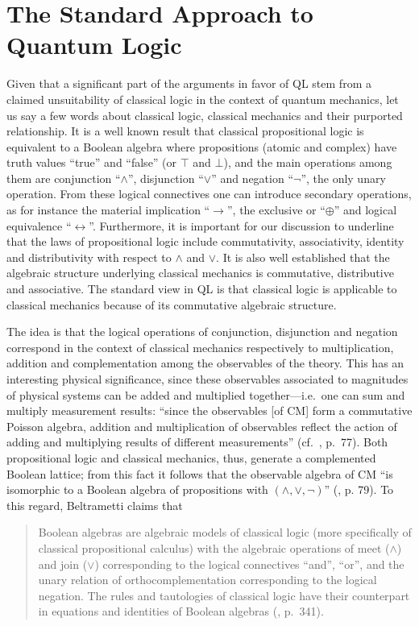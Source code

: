 \documentclass[11pt, executivepaper]{article}
\begin{document}
\section{The Standard Approach to Quantum Logic}
\label{QL}

Given that a significant part of the arguments in favor of QL stem from a claimed unsuitability of classical logic in the context of quantum mechanics, let us say a few words about classical logic, classical mechanics and their purported relationship.  It is a well known result that classical propositional logic is equivalent to a Boolean algebra where propositions (atomic and complex) have truth values ``true'' and ``false'' (or $\top$ and $\bot$), and the main operations among them are conjunction ``$\wedge$'', disjunction ``$\vee$'' and negation ``$\neg$'', the only unary operation. From these logical connectives one can introduce secondary operations, as for instance the material implication ``$\longrightarrow$'', the exclusive or ``$\oplus$'' and logical equivalence ``$\longleftrightarrow$''. Furthermore, it is important for our discussion to underline that the laws of propositional logic include commutativity, associativity, identity and distributivity with respect to $\wedge$ and $\vee$. It is also well established that the algebraic structure underlying classical mechanics is commutative, distributive and associative. The standard view in QL is that classical logic is applicable to classical mechanics because of its commutative algebraic structure.

The idea is that the logical operations of conjunction, disjunction and negation correspond in the context of classical mechanics respectively to multiplication, addition and complementation among the observables of the theory. This has an interesting physical significance, since these observables associated to magnitudes of physical systems can be added and multiplied together---i.e.\ one can sum and multiply measurement results: ``since the observables [of CM] form a commutative Poisson algebra, addition and multiplication of observables reflect the action of adding and multiplying results of different measurements'' (cf.\ \cite{David:2015}, p.\ 77). Both propositional logic and classical mechanics, thus, generate a complemented Boolean lattice; from this fact it follows that the observable algebra of CM ``is isomorphic to a Boolean algebra of propositions with $(\wedge, \vee, \neg)$'' (\cite{David:2015}, p. 79).
To this regard, Beltrametti claims that
\begin{quote}
Boolean algebras are algebraic models of classical logic (more specifically of classical propositional calculus) with the algebraic operations of meet ($\wedge$) and join ($\vee$) corresponding to the logical connectives ``and'', ``or'', and the unary relation of orthocomplementation corresponding to the logical negation. The rules and tautologies of classical logic have their counterpart in equations and identities of Boolean algebras (\cite{Beltrametti:2004}, p.\ 341). 
\end{quote}
\end{document}
